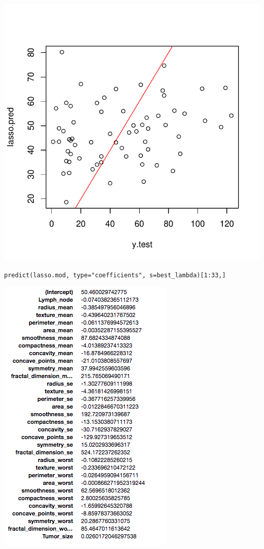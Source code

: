 \documentclass[]{report}
\begin{document}
\begin{center}
	\includegraphics{Figures/lasso_predicted.pdf}
\end{center}

\begin{lstlisting}
predict(lasso.mod, type="coefficients", s=best_lambda)[1:33,]
\end{lstlisting}

\begin{center}
	\includegraphics{Figures/ridge_coeff}
\end{center}
\end{document}
